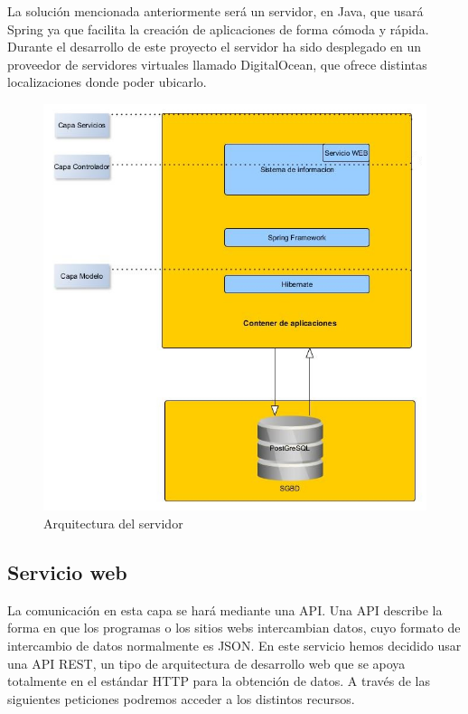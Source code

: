La solución mencionada anteriormente será un servidor, en Java, que  usará Spring \cite{10} ya que facilita la creación de aplicaciones de forma cómoda y rápida.\\

Durante el desarrollo de este proyecto el servidor ha sido desplegado en un proveedor de servidores virtuales llamado 
  DigitalOcean, que ofrece distintas localizaciones donde poder ubicarlo.
\begin{figure}
		\centering
		\includegraphics[width=\textwidth] {arquitectura-servidor.jpg}
		\caption{Arquitectura del servidor }
		\label{fig:arquitectura-servidor}
	\end{figure}


\subsection{Servicio web}
 La comunicación en esta capa se hará mediante una API. Una API describe la forma en que los programas o los sitios webs intercambian datos, cuyo formato  de intercambio de datos normalmente es JSON. En este servicio hemos decidido usar una API REST, un tipo de arquitectura de desarrollo web que se apoya totalmente en el estándar HTTP para la obtención de datos. A través de las siguientes peticiones podremos acceder a los distintos recursos.
 

